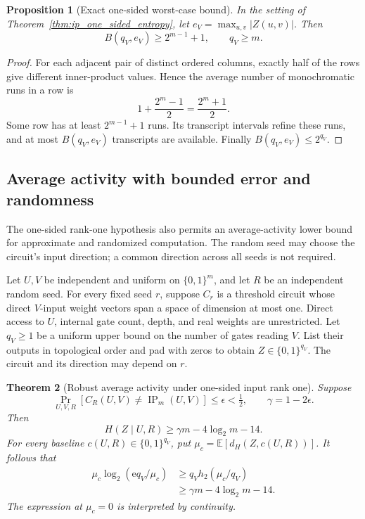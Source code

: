 \documentclass[11pt]{article}
\newtheorem{theorem}{Theorem}[section]
\newtheorem{proposition}[theorem]{Proposition}
\theoremstyle{definition}
\newcommand{\bits}{\{0,1\}}
\newcommand{\ip}{\operatorname{IP}}
\newcommand{\Eul}{\mathrm e}
\begin{document}
\begin{proposition}[Exact one-sided worst-case bound]\label{prop:ip_one_sided_patterns}
In the setting of Theorem~\ref{thm:ip_one_sided_entropy}, let \(e_V=\max_{u,v}|Z(u,v)|\). Then
\[
 B(q_V,e_V)\ge2^{m-1}+1,
 \qquad q_V\ge m.
\]
\end{proposition}

\begin{proof}
For each adjacent pair of distinct ordered columns, exactly half of the rows give different inner-product values. Hence the average number of monochromatic runs in a row is
\[
 1+\frac{2^m-1}{2}=\frac{2^m+1}{2}.
\]
Some row has at least \(2^{m-1}+1\) runs. Its transcript intervals refine these runs, and at most \(B(q_V,e_V)\) transcripts are available. Finally \(B(q_V,e_V)\le2^{q_V}\).
\end{proof}

\subsection{Average activity with bounded error and randomness}
\label{sec:sp-robust}

The one-sided rank-one hypothesis also permits an average-activity lower
bound for approximate and randomized computation. The random seed may choose
the circuit's input direction; a common direction across all seeds is not
required.

Let \(U,V\) be independent and uniform on \(\bits^m\), and let \(R\) be an
independent random seed. For every fixed seed \(r\), suppose \(C_r\) is a
threshold circuit whose direct \(V\)-input weight vectors span a space of
dimension at most one. Direct access to \(U\), internal gate count, depth, and
real weights are unrestricted. Let \(q_V\ge1\) be a uniform upper bound on the
number of gates reading \(V\). List their outputs in topological order and
pad with zeros to obtain \(Z\in\bits^{q_V}\). The circuit and its direction
may depend on \(r\).

\begin{theorem}[Robust average activity under one-sided input rank one]
\label{thm:sp-robust}
Suppose
\[
 \Pr_{U,V,R}[C_R(U,V)\ne\ip_m(U,V)]\le\epsilon<\tfrac12,
 \qquad \gamma=1-2\epsilon.
\]
Then
\[
 \boxed{\quad
 H(Z\mid U,R)
 \ge \gamma m-4\log_2m-14.
 \quad}                                                   \tag{E1}
\]
For every baseline \(c(U,R)\in\bits^{q_V}\), put
\(\mu_c=\mathbb E[d_H(Z,c(U,R))]\). It follows that
\[
 \begin{split}
 \mu_c\log_2(\Eul q_V/\mu_c)
 &\ge q_Vh_2(\mu_c/q_V)\\
 &\ge \gamma m-4\log_2m-14.
 \end{split}                                              \tag{E2}
\]
The expression at \(\mu_c=0\) is interpreted by continuity.
\end{theorem}
\end{document}
